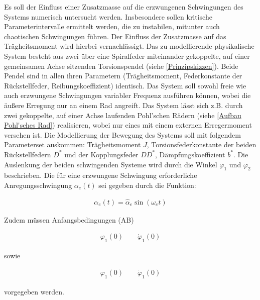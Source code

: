         Es soll der Einfluss einer Zusatzmasse auf die erzwungenen Schwingungen des Systems numerisch untersucht werden.
        Insbesondere sollen kritische Parameterintervalle ermittelt werden, die zu instabilen, mitunter auch chaotischen Schwingungen führen.
        Der Einfluss der Zusatzmasse auf das Trägheitsmoment wird hierbei vernachlässigt.
        Das zu modellierende physikalische System besteht aus zwei über eine Spiralfeder miteinander gekoppelte, auf einer gemeinsamen Achse sitzenden Torsionspendel (siehe \cref{Prinzipskizzen}). Beide Pendel sind in allen ihren Parametern (Trägheitsmoment, Federkonstante der Rückstellfeder, Reibungskoeffizient) identisch.
        Das System soll sowohl freie wie auch erzwungene Schwingungen variabler Frequenz ausführen können, wobei die äußere Erregung nur an einem Rad angreift.
        Das System lässt sich z.B. durch zwei gekoppelte, auf einer Achse laufenden Pohl'schen Rädern (siehe \cref{Aufbau Pohl'sches Rad}) realisieren, wobei nur eines mit einem externen Erregermoment versehen ist.
        Die Modellierung der Bewegung des Systems soll mit folgendem Parameterset auskommen: Trägheitsmoment \(J\), Torsionsfederkonstante der beiden Rückstellfedern \(D^\ast\) und der Kopplungsfeder \(DD^\ast\), Dämpfungskoeffizient \(b^\ast\).
        Die Auslenkung der beiden schwingenden Systeme wird durch die Winkel \(\varphi_1\) und \(\varphi_2\) beschrieben.
        Die für eine erzwungene Schwingung erforderliche Anregungsschwingung \(\alpha_e(t)\) sei gegeben durch die Funktion:

        \begin{align}
            \alpha_e(t) = \hat{\alpha}_e \sin(\omega_e t)\nonumber
        \end{align}

        Zudem müssen Anfangsbedingungen (AB)

        \begin{align}
            \varphi_1(0) \qquad \dot{\varphi}_1(0)\nonumber
        \end{align}

        sowie

        \begin{align}
            \varphi_1(0) \qquad \dot{\varphi}_1(0)\nonumber
        \end{align}

        vorgegeben werden.\par\medskip

